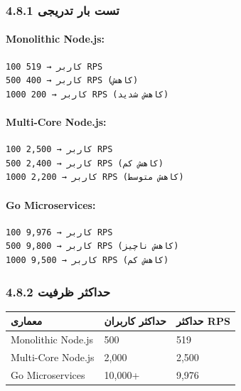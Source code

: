 \documentclass[
]{article}
\newcounter{none} %
\begin{document}
\subsubsection{4.8.1 تست بار
تدریجی}\label{ux62aux633ux62a-ux628ux627ux631-ux62aux62fux631ux6ccux62cux6cc}

\paragraph{Monolithic Node.js:}\label{monolithic-node.js}

\begin{verbatim}
100 کاربر → 519 RPS
500 کاربر → 400 RPS (کاهش)
1000 کاربر → 200 RPS (کاهش شدید)
\end{verbatim}

\paragraph{Multi-Core Node.js:}\label{multi-core-node.js}

\begin{verbatim}
100 کاربر → 2,500 RPS
500 کاربر → 2,400 RPS (کاهش کم)
1000 کاربر → 2,200 RPS (کاهش متوسط)
\end{verbatim}

\paragraph{Go Microservices:}\label{go-microservices}

\begin{verbatim}
100 کاربر → 9,976 RPS
500 کاربر → 9,800 RPS (کاهش ناچیز)
1000 کاربر → 9,500 RPS (کاهش کم)
\end{verbatim}

\subsubsection{4.8.2 حداکثر
ظرفیت}\label{ux62dux62fux627ux6a9ux62bux631-ux638ux631ux641ux6ccux62a}

{\def\LTcaptype{none} %
\begin{longtable}[]{@{}lll@{}}
\toprule\noalign{}
معماری & حداکثر کاربران & حداکثر RPS \\
\midrule\noalign{}
\endhead
\bottomrule\noalign{}
\endlastfoot
Monolithic Node.js & 500 & 519 \\
Multi-Core Node.js & 2,000 & 2,500 \\
Go Microservices & 10,000+ & 9,976 \\
\end{longtable}
}
\end{document}
